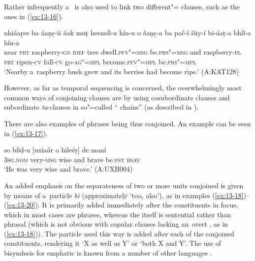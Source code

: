 Rather infrequently a~ is also used to link two different"= clauses, such as the ones in (\ref{ex:13-16}).

\begin{exe}
\ex
\label{ex:13-16}
\gll nhiáaṛee ba áaṇc̣-ii áak muṭ heensíl-u hín-u o áaṇc̣-a ba pač-í šiiy-í bi-áaṭ-a bhíl-a hín-a \\
near \textsc{prt} raspberry-\textsc{gn} \textsc{idef} tree dwell.\textsc{pfv"=msg}  be.\textsc{prs"=msg} and raspberry-\textsc{pl} \textsc{prt} ripen-\textsc{cv} fall-\textsc{cv} go-\textsc{ag"=mpl} become.\textsc{pfv"=mpl} be.\textsc{prs"=mpl} \\
\glt `Nearby a~raspberry bush grew and its berries had become ripe.' (A:KAT128) 
\end{exe}

However, as far as temporal sequencing is concerned, the overwhelmingly most common ways of conjoining clauses are by using cosubordinate  clauses and subordinate \textit{ta}-clauses in so"=called `` chains'' (as described in ).


There are also examples of   phrases being thus conjoined. An example can be seen in (\ref{ex:13-17}).

\begin{exe}
\ex
\label{ex:13-17}
\gll so bíiḍ-u [uxiaár o hileéṛ] de maní  \\
\textsc{3sg.nom} very-\textsc{msg} wise and brave be.\textsc{pst} \textsc{hsay} \\
\glt `He was very wise and brave.' (A:UXB004) 
\end{exe}

 An added emphasis on the separateness of two or more units conjoined is given by means of a~particle \textit{bi} (approximately `too, also'), as in examples (\ref{ex:13-18})--(\ref{ex:13-20}). It is primarily added immediately after the constituents in focus, which in most cases are  phrases, whereas the  itself is sentential rather than phrasal (which is not obvious with copular clauses lacking an~overt , as in (\ref{ex:13-18})). The particle used this way is added after each of the conjoined constituents, rendering it `X as well as Y' or `both X and Y'. The use of bisyndesis for emphatic  is known from a number of other languages \citep[15--17]{haspelmath2007}. 

